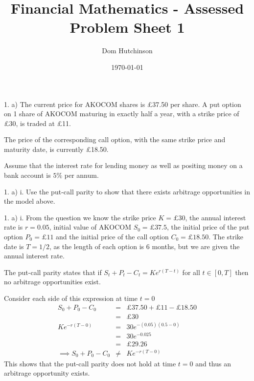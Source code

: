 \documentclass[11pt,a4paper]{article}
\begin{document}
\questionsfalse

\title{Financial Mathematics - Assessed Problem Sheet 1}
\author{Dom Hutchinson}
\date{\today}
\maketitle

\begin{question}{1. a)}
  The current price for AKOCOM shares is £37.50 per share. A put option on 1 share of AKOCOM maturing in exactly half a year, with a strike price of £30, is traded at £11.
  \par The price of the corresponding call option, with the same strike price and maturity date, is currently £18.50.
  \par Assume that the interest rate for lending money as well as positing money on a bank account is $5\%$ per annum.
\end{question}

\begin{question}{1. a) i.}
  Use the put-call parity to show that there exists arbitrage opportunities in the model above.
\end{question}

\begin{answer}{1. a) i.}
  From the question we know the strike price $K=\pounds30$, the annual interest rate is $r=0.05$, initial value of AKOCOM $S_0=\pounds37.5$, the initial price of the put option $P_0=\pounds11$ and the initial price of the call option $C_0=\pounds18.50$. The strike date is $T=1/2$, as the length of each option is 6 months, but we are given the annual interest rate.
  \par The put-call parity states that if $S_t+P_t-C_t=Ke^{r(T-t)}$ for all $t\in[0,T]$ then no arbitrage opportunities exist.
  \par Consider each side of this expression at time $t=0$
  \[\begin{array}{rcl}
    S_0+P_0-C_0&=&\pounds37.50+\pounds11-\pounds18.50\\
    &=&\pounds30\\
    Ke^{-r(T-0)}&=&30e^{-(0.05)(0.5-0)}\\
    &=&30e^{-0.025}\\
    &=&\pounds29.26\\
    \implies S_0+P_0-C_0&\neq&Ke^{-r(T-0)}
  \end{array}\]
  This shows that the put-call parity does not hold at time $t=0$ and thus an arbitrage opportunity exists.
\end{answer}
\end{document}
